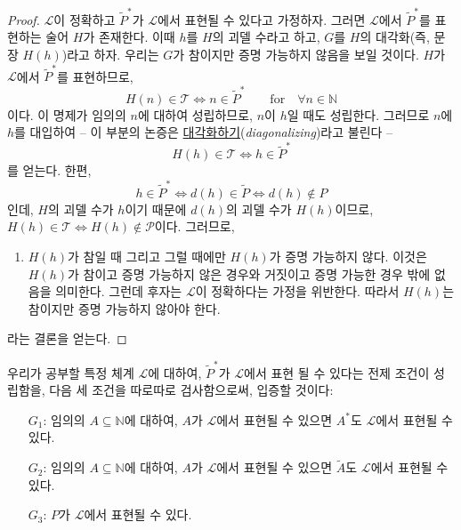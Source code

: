 \documentclass[12pt]{paper}
\begin{document}
  \begin{proof}
    $\mathcal{L}$이 정확하고 $\tilde{P}^{*}$가 $\mathcal{L}$에서 표현될 수 있다고 가정하자.
    그러면 $\mathcal{L}$에서 $\tilde{P}^{*}$를 표현하는 술어 $H$가 존재한다.
    이때 $h$를 $H$의 괴델 수라고 하고,
    $G$를 $H$의 대각화(즉, 문장 $ H \left( h \right) $)라고 하자.
    우리는 $G$가 참이지만 증명 가능하지 않음을 보일 것이다.
    $H$가 $\mathcal{L}$에서 $\tilde{P}^{*}$를 표현하므로,
    $$ H \left( n \right) \in \mathcal{T} \iff n \in \tilde{P}^{*} \qquad \mathrm{for} \quad \forall n \in \mathbb{N} $$이다.
    이 명제가 임의의 $n$에 대하여 성립하므로,
    $n$이 $h$일 때도 성립한다.
    그러므로 $n$에 $h$를 대입하여 --
    이 부분의 논증은 \underline{대각화하기}(\textit{diagonalizing})라고 불린다 --
    $$ H \left( h \right) \in \mathcal{T} \iff h \in \tilde{P}^{*}$$를 얻는다.
    한편, $$h \in \tilde{P}^{*} \iff d \left( h \right) \in \tilde{P} \iff d \left( h \right) \notin P$$인데,
    $H$의 괴델 수가 $h$이기 때문에 $d \left( h \right)$의 괴델 수가 $H \left( h \right)$이므로,
    $ H \left( h \right) \in \mathcal{T} \iff H \left( h \right) \notin \mathcal{P}$이다.
    그러므로,
    \begin{enumerate}
      \item $H \left( h \right)$가 참일 때 그리고 그럴 때에만 $H \left( h \right)$가 증명 가능하지 않다.
      이것은 $H \left( h \right)$가 참이고 증명 가능하지 않은 경우와 거짓이고 증명 가능한 경우 밖에 없음을 의미한다.
      그런데 후자는 $\mathcal{L}$이 정확하다는 가정을 위반한다.
      따라서 $H \left( h \right)$는 참이지만 증명 가능하지 않아야 한다.
    \end{enumerate}
    라는 결론을 얻는다.
  \end{proof}

  우리가 공부할 특정 체계 $\mathcal{L}$에 대하여,
  $\tilde{P}^{*}$가 $\mathcal{L}$에서 표현 될 수 있다는 전제 조건이 성립함을,
  다음 세 조건을 따로따로 검사함으로써, 입증할 것이다:
  \begin{itemize}
    \item[$G_1$:] 임의의 $A \subseteq \mathbb{N}$에 대하여, $A$가 $\mathcal{L}$에서 표현될 수 있으면 $A^{*}$도 $\mathcal{L}$에서 표현될 수 있다.
    \item[$G_2$:] 임의의 $A \subseteq \mathbb{N}$에 대하여, $A$가 $\mathcal{L}$에서 표현될 수 있으면 $\tilde{A}$도 $\mathcal{L}$에서 표현될 수 있다.
    \item[$G_3$:] $P$가 $\mathcal{L}$에서 표현될 수 있다.
  \end{itemize}
\end{document}
